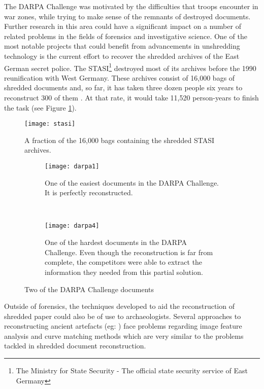 The DARPA Challenge was motivated by the difficulties that troops encounter in war zones, while trying to make sense of the remnants of destroyed documents. Further research in this area could  have a significant impact on a number of related problems in the fields of forensics and investigative science. One of the most notable projects that could benefit from advancements in unshredding technology is the  current effort to recover the shredded archives of the East German secret police. The STASI\footnote{The Ministry for State Security - The official state security service of East Germany} destroyed most of its archives before the 1990 reunification with West Germany. These archives consist of 16,000 bags of shredded documents and, so far, it has taken three dozen people six years to reconstruct 300 of them \cite{P16}. At that rate, it would take 11,520 person-years to finish the task (see Figure \ref{fig:stasi}).

\begin{figure}[H]
    \centering
    \texttt{[image: stasi]}
    \caption{A fraction of the 16,000 bags containing the shredded STASI archives.}
    \label{fig:stasi}
\end{figure}

\begin{figure}[H]
    \centering
    \begin{subfigure}[b]{\textwidth}
        \centering
        \texttt{[image: darpa1]}
        \caption{One of the easiest documents in the DARPA Challenge. It is perfectly reconstructed.}
    \end{subfigure}
    ~
    \begin{subfigure}[b]{\textwidth}
        \centering
        \texttt{[image: darpa4]}
        \caption{One of the hardest documents in the DARPA Challenge. Even though the reconstruction is far from complete, the competitors were able to extract the information they needed from this partial solution.}
    \end{subfigure}
     \caption{Two of the DARPA Challenge documents \cite{P15}}
    \label{fig:darpa}
\end{figure}

Outside of forensics, the techniques developed to aid the reconstruction of shredded paper could also be of use to archaeologists. Several approaches to reconstructing ancient artefacts (eg: \cite{P28,P29}) face problems regarding image feature analysis and curve matching methods which are very similar to the problems tackled in shredded document reconstruction.

